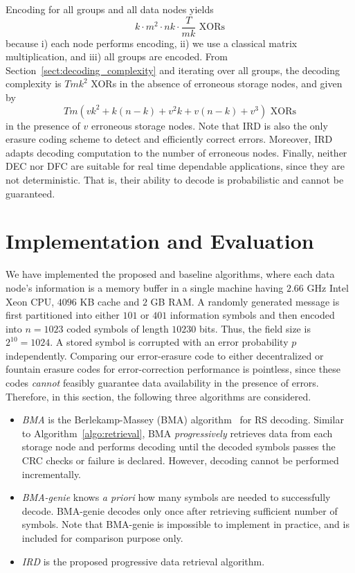 \documentclass[10pt,journal,letterpaper,compsoc]{IEEEtran}
\newcommand{\0}{{\bf 0}}
\begin{document}
Encoding for all groups and all data  nodes yields
$$k\cdot m^2\cdot nk\cdot\frac{T}{mk}\text{ XORs}$$
because i) each node performs encoding, ii) we use a classical matrix multiplication, and iii) all groups are encoded.
From Section~\ref{sect:decoding_complexity} and iterating over all groups, the decoding complexity is $Tmk^2$ XORs in the absence of erroneous storage nodes, and given by
$$Tm(vk^2 +k(n-k)+v^2k+v(n-k)+v^3)\text{ XORs}$$ in the presence of $v$ erroneous storage nodes. Note that IRD is also the only erasure coding scheme to detect and efficiently correct errors. Moreover, IRD adapts decoding computation to the number of erroneous nodes. Finally, neither DEC nor DFC are suitable for real time dependable applications, since they are not deterministic. That is, their ability to decode is probabilistic and cannot be guaranteed.
\section{Implementation and Evaluation}
\label{sect:eval}
We have implemented the proposed and baseline algorithms, where each data node's 
information is a memory buffer in a single machine having
$2.66$ GHz Intel Xeon CPU, $4096$ KB cache and
$2$ GB RAM. A randomly generated message is first
partitioned into either $101$ or $401$ information symbols and then encoded into $n=1023$ coded
symbols of length $10230$ bits. 
Thus, the field size is $2^{10} = 1024$. A
stored symbol is corrupted with an error probability $p$ independently.
Comparing our error-erasure code to either decentralized or fountain erasure codes for error-correction performance is pointless, since these codes
\emph{cannot} feasibly guarantee data availability in the presence of errors. Therefore, in this section, the following three algorithms are considered.
\begin{itemize}
\item{\it BMA} is the Berlekamp-Massey (BMA) algorithm~\cite{MOO05} for
RS decoding. Similar to Algorithm~\ref{algo:retrieval}, BMA {\it progressively}
retrieves data from each storage node and performs decoding until
the decoded symbols passes the CRC checks or failure is declared. However,
decoding cannot be performed incrementally. 
\item{\it BMA-genie} knows \emph{a priori} how many symbols are needed to
successfully decode. BMA-genie decodes only once after retrieving sufficient
number of symbols. Note that BMA-genie is impossible to implement in practice,
and is included for comparison purpose only.
\item{\it IRD} is the proposed progressive data retrieval algorithm. 
\end{itemize}
\begin{comment}
In place of BMA, either the Euclidean or Welch-Berlekamp algorithm could have been used. 
They have the same asymptotic time complexity. 
Figures~\ref{fig:alg_time} and \ref{fig:breakdown} show the time it takes to
correctly decode a data block. 
\end{comment}
\end{document}
